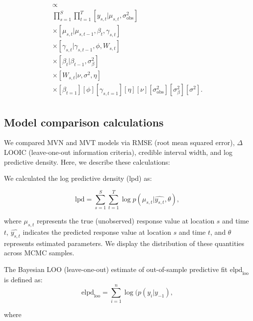 \documentclass[12pt,english]{article}
\begin{document}
\begin{multline}
  [\bm{\mu},
  \bm{\gamma},
  \bm{W},
  \bm{\beta},
  \phi,
  \eta,
  \nu,
  \sigma^2_{\mathrm{obs}},
  \sigma^2_{\beta},
  \sigma^2
  |
  \bm{y}]
  \propto \\
  \prod_{s=1}^{S} \prod_{t=1}^{T}
  [y_{s,t} | \mu_{s,t}, \sigma^2_{\mathrm{obs}}] \\
  \times [\mu_{s,t} | \mu_{s,t-1}, \beta_t, \gamma_{s,t} ] \\
  \times [\gamma_{s,t} | \gamma_{s,t-1}, \phi, W_{s,t}] \\
  \times [\beta_t | \beta_{t-1}, \sigma^2_{\beta}] \\
  \times [W_{s,t} | \nu, \sigma^2, \eta] \\
  \times
  [\beta_{t=1}]
  [\phi]
  [\gamma_{s,t=1}]
  [\eta]
  [\nu]
  [\sigma^2_{\mathrm{obs}}]
  [\sigma^2_{\beta}]
  [\sigma^2].
  \\
\end{multline}

\subsection{Model comparison calculations}

We compared MVN and MVT models via RMSE (root mean squared error), $\Delta$
LOOIC (leave-one-out information criteria), credible interval width,
and log predictive density. Here, we describe these calculations:

We calculated the log predictive density (lpd) as:

\begin{equation}
  \mathrm{lpd} = \sum^{S}_{s=1}{ \sum^{T}_{t=1}{ \log  p(\mu_{s,t} | \widehat{y_{s,t}}, \theta)}},
\end{equation}

\noindent where $\mu_{s,t}$ represents the true (unobserved) response value at
location $s$ and time $t$, $\widehat{y_{s,t}}$ indicates the predicted
response value at location $s$ and time $t$, and $\theta$ represents estimated
parameters. We display the distribution of these quantities across MCMC
samples.

The Bayesian LOO (leave-one-out) estimate of out-of-sample
predictive fit $\mathrm{elpd}_\mathrm{loo}$ is defined as:
\begin{equation}
  \mathrm{elpd}_\mathrm{loo} = \sum^{n}_{i=1}{\log ( p(y_i | y_{-1}) },
\end{equation}

\noindent where
\end{document}
